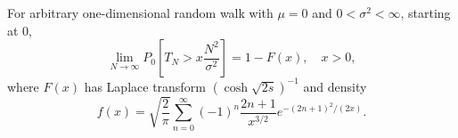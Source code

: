 For arbitrary one-dimensional random walk with \(\mu = 0\) and \(0 < \sigma^2 < \infty\), starting at \(0\),
\[
\lim_{N \to \infty} P_0\!\left[T_N > x \frac{N^2}{\sigma^2}\right] = 1 - F(x), \quad x > 0,
\]
where \(F(x)\) has Laplace transform \((\cosh\sqrt{2s})^{-1}\) and density
\[
f(x) = \sqrt{\frac{2}{\pi}} \sum_{n=0}^{\infty} (-1)^n \frac{2n+1}{x^{3/2}} e^{-(2n+1)^2/(2x)}.
\]
